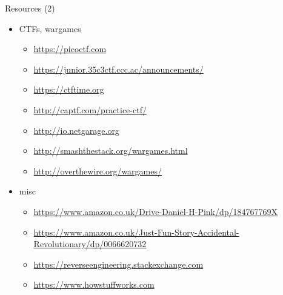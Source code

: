 \documentclass{simple}
\begin{document}
\begin{frame}{Resources (2)}
  \begin{itemize}
    \item CTFs, wargames
      \begin{itemize}
        \item \url{https://picoctf.com}
        \item \url{https://junior.35c3ctf.ccc.ac/announcements/}
        \item \url{https://ctftime.org}
        \item \url{http://captf.com/practice-ctf/}
        \item \url{http://io.netgarage.org}
        \item \url{http://smashthestack.org/wargames.html}
        \item \url{http://overthewire.org/wargames/}
      \end{itemize}
    \item misc
      \begin{itemize}
        \item \url{https://www.amazon.co.uk/Drive-Daniel-H-Pink/dp/184767769X}
        \item \url{https://www.amazon.co.uk/Just-Fun-Story-Accidental-Revolutionary/dp/0066620732}
        \item \url{https://reverseengineering.stackexchange.com}
        \item \url{https://www.howstuffworks.com}
      \end{itemize}
  \end{itemize}
\end{frame}
\end{document}
